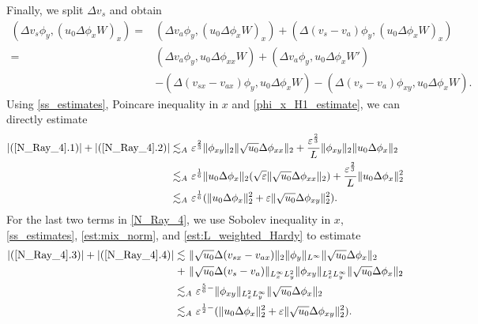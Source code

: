 \documentclass[reqno, 11pt]{amsart}
\theoremstyle{plain}
\theoremstyle{definition}
\theoremstyle{remark}
\numberwithin{equation}{section}
\begin{document}
Finally, we split $\Delta v_s$ and obtain 
\begin{equation}\label{N_Ray_4}
\begin{aligned}
(\Delta v_s  \phi_y, (u_0 \Delta\phi_x W)_x) = & (\Delta v_a  \phi_y, (u_0 \Delta\phi_x W)_x) + (\Delta (v_s-v_a)  \phi_y, (u_0 \Delta\phi_x W)_x)\\
=& (\Delta v_a  \phi_y, u_0 \Delta\phi_{xx} W) + (\Delta v_a  \phi_y, u_0 \Delta\phi_x W')\\
& - (\Delta (v_{sx}-v_{ax})  \phi_y, u_0 \Delta\phi_x W) - (\Delta (v_s-v_a)  \phi_{xy}, u_0 \Delta\phi_x W).
\end{aligned}
\end{equation}
Using \eqref{ss_estimates}, Poincare inequality in $x$ and \eqref{phi_x_H1_estimate}, we can directly estimate
\begin{equation}\label{N_Ray_4_1}
\begin{aligned}
|(\ref{N_Ray_4}.1)|+ |(\ref{N_Ray_4}.2)| \lesssim_A &~ \varepsilon^{\frac{2}{3}} \| \phi_{xy}\|_2 \|\sqrt{u_0} \Delta\phi_{xx}\|_2 + \frac{\varepsilon^{\frac{2}{3}}}{L} \| \phi_{xy}\|_2  \|u_0 \Delta\phi_{x}\|_2\\
\lesssim_A &~ \varepsilon^{\frac{1}{6}} \|u_0 \Delta\phi_{x}\|_2 ( \sqrt{\varepsilon} \|\sqrt{u_0} \Delta\phi_{xx}\|_2) + \frac{\varepsilon^{\frac{2}{3}}}{L} \|u_0 \Delta\phi_{x}\|_2^2\\
\lesssim_A &~ \varepsilon^{\frac{1}{6}}(\|u_0 \Delta \phi_x\|_2^2  +  \varepsilon \| \sqrt{u_0} \Delta \phi_{xy} \|_2^2).
\end{aligned}
\end{equation}
For the last two terms in \eqref{N_Ray_4}, we use Sobolev inequality in $x$, \eqref{ss_estimates}, \eqref{est:mix_norm}, and \eqref{est:L_weighted_Hardy} to estimate
\begin{equation}\label{N_Ray_4_2}
\begin{aligned}
|(\ref{N_Ray_4}.3)|+ |(\ref{N_Ray_4}.4)| \lesssim &~ \| \sqrt{u_0} \Delta (v_{sx}-v_{ax})\|_2 \|\phi_y\|_{L^\infty} \| \sqrt{u_0} \Delta \phi_x\|_2\\
+&~  \| \sqrt{u_0} \Delta (v_{s}-v_{a})\|_{L^\infty_x L^2_y} \| \phi_{xy}\|_{L^2_x L^\infty_y}  \| \sqrt{u_0} \Delta \phi_x\|_2\\
\lesssim&_A ~ \varepsilon^{\frac{5}{6}-}\| \phi_{xy}\|_{L^2_x L^\infty_y}  \| \sqrt{u_0} \Delta \phi_x\|_2\\
\lesssim&_A ~ \varepsilon^{\frac{1}{2}-}(\|u_0 \Delta \phi_x\|_2^2  +  \varepsilon \| \sqrt{u_0} \Delta \phi_{xy} \|_2^2).
\end{aligned}
\end{equation}
\end{document}
